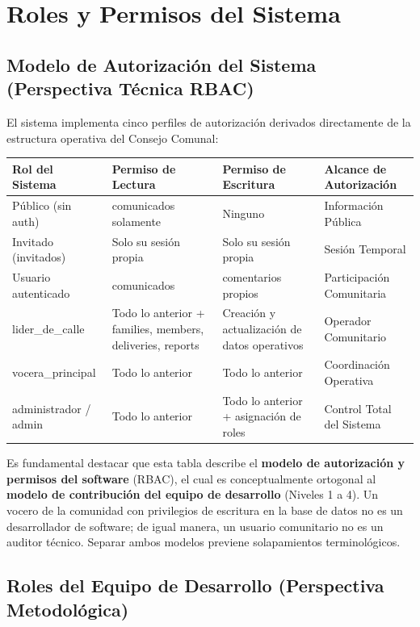 \documentclass[14pt,a4paper,oneside]{extbook}
\begin{document}
\section{Roles y Permisos del Sistema}

\subsection{Modelo de Autorización del Sistema (Perspectiva Técnica RBAC)}

El sistema implementa cinco perfiles de autorización derivados directamente de la estructura operativa del Consejo Comunal:

\begin{table}[htbp]
\centering
\begin{tabular}{p{} p{} p{} p{}}
\toprule
\textbf{Rol del Sistema} & \textbf{Permiso de Lectura} & \textbf{Permiso de Escritura} & \textbf{Alcance de Autorización} \\
\midrule
Público (sin auth) & comunicados solamente & Ninguno & Información Pública \\
Invitado (invitados) & Solo su sesión propia & Solo su sesión propia & Sesión Temporal \\
Usuario autenticado & comunicados & comentarios propios & Participación Comunitaria \\
lider\_de\_calle & Todo lo anterior + families, members, deliveries, reports & Creación y actualización de datos operativos & Operador Comunitario \\
vocera\_principal & Todo lo anterior & Todo lo anterior & Coordinación Operativa \\
administrador / admin & Todo lo anterior & Todo lo anterior + asignación de roles & Control Total del Sistema \\
\bottomrule
\end{tabular}
\end{table}

Es fundamental destacar que esta tabla describe el \textbf{modelo de autorización y permisos del software} (RBAC), el cual es conceptualmente ortogonal al \textbf{modelo de contribución del equipo de desarrollo} (Niveles 1 a 4). Un vocero de la comunidad con privilegios de escritura en la base de datos no es un desarrollador de software; de igual manera, un usuario comunitario no es un auditor técnico. Separar ambos modelos previene solapamientos terminológicos.

\subsection{Roles del Equipo de Desarrollo (Perspectiva Metodológica)}
\end{document}

